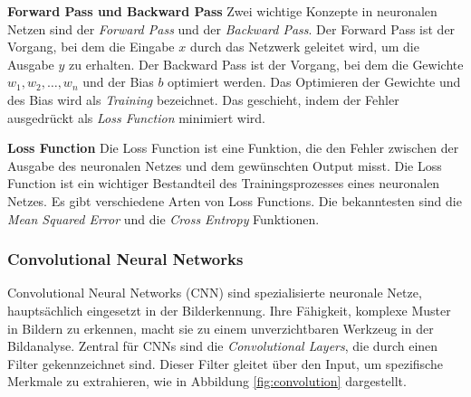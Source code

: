 \documentclass[11pt,a4paper]{article}
\begin{document}
\noindent \newline \textbf{Forward Pass und Backward Pass} \newline
Zwei wichtige Konzepte in neuronalen Netzen sind der \textit{Forward Pass} und der
\textit{Backward Pass}. Der Forward Pass ist der Vorgang, bei dem die Eingabe \(x\) durch das
Netzwerk geleitet wird, um die Ausgabe \(y\) zu erhalten. Der Backward Pass ist der Vorgang, bei
dem die Gewichte \(w_{1}, w_{2}, \dots, w_{n}\) und der Bias \(b\) optimiert werden. Das Optimieren
der Gewichte und des Bias wird als \textit{Training} bezeichnet. Das geschieht, indem der Fehler 
ausgedrückt als \textit{Loss Function} minimiert wird.


\noindent \newline \textbf{Loss Function} \newline
Die Loss Function ist eine Funktion, die den Fehler zwischen der Ausgabe des neuronalen Netzes und
dem gewünschten Output misst. Die Loss Function ist ein wichtiger Bestandteil des Trainingsprozesses
eines neuronalen Netzes. Es gibt verschiedene Arten von Loss Functions. Die bekanntesten sind die
\textit{Mean Squared Error} und die \textit{Cross Entropy} Funktionen.


\subsubsection{Convolutional Neural Networks}
Convolutional Neural Networks (CNN) sind spezialisierte neuronale Netze, hauptsächlich eingesetzt 
in der Bilderkennung. Ihre Fähigkeit, komplexe Muster in Bildern zu erkennen, macht sie zu einem 
unverzichtbaren Werkzeug in der Bildanalyse. Zentral für CNNs sind die 
\textit{Convolutional Layers}, die durch einen Filter gekennzeichnet sind. Dieser Filter gleitet 
über den Input, um spezifische Merkmale zu extrahieren, wie in Abbildung \ref{fig:convolution} 
dargestellt.
\end{document}
